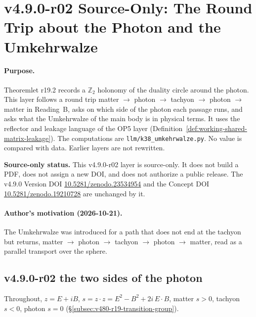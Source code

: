\clearpage
\section*{v4.9.0-r02 Source-Only: The Round Trip about the Photon and the Umkehrwalze}
\label{sec:v490-r02-round-trip-umkehrwalze}

\paragraph{Purpose.}
Theoremlet r19.2 records a \(\mathbb Z_2\) holonomy of the duality circle around the photon.  This layer follows a round
trip matter \(\to\) photon \(\to\) tachyon \(\to\) photon \(\to\) matter in Reading~B, asks on which side of the photon each
passage runs, and asks what the Umkehrwalze of the main body is in physical terms.  It uses the reflector and leakage
language of the OP5 layer (Definition~\ref{def:working-shared-matrix-leakage}).  The computations are
\texttt{llm/k38\_umkehrwalze.py}.  No value is compared with data.  Earlier layers are not rewritten.

\noindent\textbf{Source-only status.}
This v4.9.0-r02 layer is source-only.  It does not build a PDF, does not assign a new DOI,
and does not authorize a public release.  The v4.9.0 Version DOI
\href{https://doi.org/10.5281/zenodo.23534954}{10.5281/zenodo.23534954} and the Concept DOI
\href{https://doi.org/10.5281/zenodo.19210728}{10.5281/zenodo.19210728} are unchanged by it.

\paragraph{Author's motivation (2026-10-21).}
The Umkehrwalze was introduced for a path that does not end at the tachyon but returns, matter \(\to\) photon \(\to\)
tachyon \(\to\) photon \(\to\) matter, read as a parallel transport over the sphere.

\subsection*{v4.9.0-r02 the two sides of the photon}
\label{subsec:v490-r02-sides}

Throughout, \(z=E+iB\), \(s=z\cdot z=E^2-B^2+2i\,E\cdot B\), matter \(s>0\), tachyon \(s<0\), photon \(s=0\)
(\S\ref{subsec:v480-r19-transition-group}).

